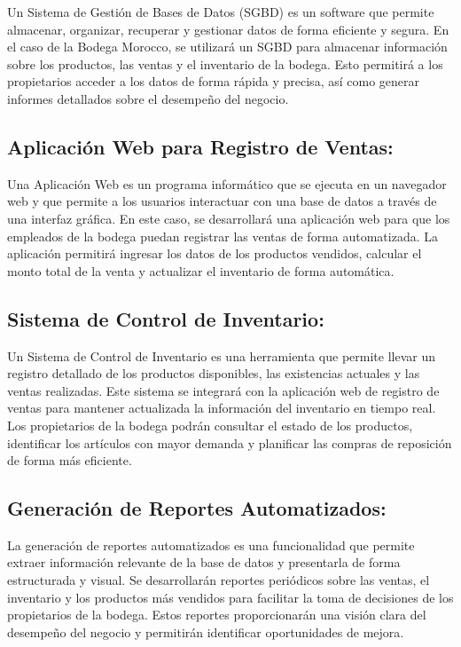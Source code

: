 \documentclass{article}
\begin{document}
    Un Sistema de Gestión de Bases de Datos (SGBD) es un software que permite almacenar, organizar, recuperar y gestionar datos de forma eficiente y segura. En el caso de la Bodega Morocco, se utilizará un SGBD para almacenar información sobre los productos, las ventas y el inventario de la bodega. Esto permitirá a los propietarios acceder a los datos de forma rápida y precisa, así como generar informes detallados sobre el desempeño del negocio.

  \subsection{Aplicación Web para Registro de Ventas:}

    Una Aplicación Web es un programa informático que se ejecuta en un navegador web y que permite a los usuarios interactuar con una base de datos a través de una interfaz gráfica. En este caso, se desarrollará una aplicación web para que los empleados de la bodega puedan registrar las ventas de forma automatizada. La aplicación permitirá ingresar los datos de los productos vendidos, calcular el monto total de la venta y actualizar el inventario de forma automática.

  \subsection{Sistema de Control de Inventario:}

    Un Sistema de Control de Inventario es una herramienta que permite llevar un registro detallado de los productos disponibles, las existencias actuales y las ventas realizadas. Este sistema se integrará con la aplicación web de registro de ventas para mantener actualizada la información del inventario en tiempo real. Los propietarios de la bodega podrán consultar el estado de los productos, identificar los artículos con mayor demanda y planificar las compras de reposición de forma más eficiente.

  \subsection{Generación de Reportes Automatizados:}

    La generación de reportes automatizados es una funcionalidad que permite extraer información relevante de la base de datos y presentarla de forma estructurada y visual. Se desarrollarán reportes periódicos sobre las ventas, el inventario y los productos más vendidos para facilitar la toma de decisiones de los propietarios de la bodega. Estos reportes proporcionarán una visión clara del desempeño del negocio y permitirán identificar oportunidades de mejora.
\end{document}
